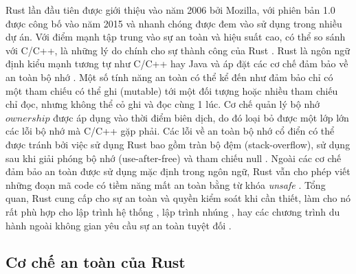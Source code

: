 Rust lần đầu tiên được giới thiệu vào năm 2006 bởi Mozilla, với phiên bản 1.0 được công bố vào năm 2015 và nhanh chóng được đem vào sử dụng trong nhiều dự án.
Với điểm mạnh tập trung vào sự an toàn và hiệu suất cao, có thể so sánh với C/C++, là những lý do chính cho sự thành công của Rust \cite{je2020scientists,stackoverflowStackOverflow}.
Rust là ngôn ngữ định kiểu mạnh tương tự như C/C++ hay Java và áp đặt các cơ chế đảm bảo về an toàn bộ nhớ \cite{rustlangRustProgramming}.
Một số tính năng an toàn có thể kể đến như đảm bảo chỉ có một tham chiếu có thể ghi (mutable) tới một đối tượng hoặc nhiều tham chiếu chỉ đọc, nhưng không thể cỏ ghi và đọc cùng 1 lúc.
Cơ chế quản lý bộ nhớ $ownership$ được áp dụng vào thời điểm biên dịch, do đó loại bỏ được một lớp lớn các lỗi bộ nhớ mà C/C++ gặp phải.
Các lỗi về an toàn bộ nhớ cổ điển có thể được tránh bởi việc sử dụng Rust bao gồm tràn bộ đệm (stack-overflow), sử dụng sau khi giải phóng bộ nhớ (use-after-free) và tham chiếu null \cite{googleblogMemorySafe}.
Ngoài các cơ chế đảm bảo an toàn được sử dụng mặc định trong ngôn ngữ, Rust vẫn cho phép viết những đoạn mã code có tiềm năng mất an toàn bằng từ khóa \textit{unsafe} \cite{rustlangRustProgramming}.
Tổng quan, Rust cung cấp cho sự an toàn và quyền kiểm soát khi cần thiết, làm cho nó rất phù hợp cho lập trình hệ thống \cite{jung2021safe}, lập trình nhúng \cite{sharma2023rust}, hay các chương trình du hành ngoài không gian yêu cầu sự an toàn tuyệt đối \cite{seidel2024bringing}.

\subsection{Cơ chế an toàn của Rust}

